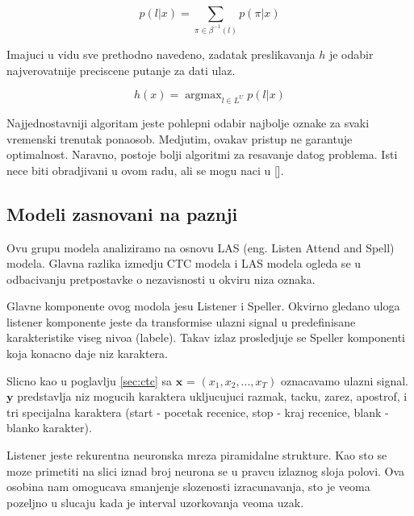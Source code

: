 \documentclass[a4paper]{article}
\DeclareMathOperator*{\argmax}{argmax}
\begin{document}
\begin{equation}
\label{eq:beta}
p(l | x) = \sum_{\pi \in \beta^{-1}(l)} p(\pi | x)
\end{equation}

Imajuci u vidu sve prethodno navedeno,  zadatak preslikavanja $h$ je odabir najverovatnije preciscene putanje za dati ulaz.

\begin{equation}
\label{eq:h_x}
h(x) = \argmax_{l \in L^U} p(l | x)
\end{equation}

Najjednostavniji algoritam jeste pohlepni odabir najbolje oznake za svaki vremenski trenutak ponaosob.  Medjutim, ovakav pristup ne garantuje optimalnost.  Naravno,  postoje bolji algoritmi za resavanje datog problema. Isti nece biti obradjivani u ovom radu, ali se mogu naci u [].

\subsection{Modeli zasnovani na paznji}

Ovu grupu modela analiziramo na osnovu LAS (eng.  Listen Attend and Spell) modela.  Glavna razlika izmedju CTC modela i LAS modela ogleda se u odbacivanju pretpostavke o nezavisnosti u okviru niza oznaka.  

\bigskip
Glavne komponente ovog modola jesu Listener i Speller.  Okvirno gledano uloga listener komponente jeste da transformise ulazni signal u predefinisane karakteristike viseg nivoa (labele).  Takav izlaz prosledjuje se Speller komponenti koja konacno daje niz karaktera. 

\bigskip

Slicno kao u poglavlju \ref{sec:ctc} sa $\textbf{x}$ = $(x_1,  x_2,  ...,  x_T)$ oznacavamo ulazni signal.  $\textbf{y}$ predstavlja niz mogucih karaktera ukljucujuci razmak,  tacku,  zarez,  apostrof,  i tri specijalna karaktera (start - pocetak recenice,  stop - kraj recenice,  blank - blanko karakter).

\bigskip

Listener jeste rekurentna neuronska mreza piramidalne strukture.  Kao sto se moze primetiti na slici iznad broj neurona se u pravcu izlaznog sloja polovi.  Ova osobina nam omogucava smanjenje slozenosti izracunavanja,  sto je veoma pozeljno u slucaju kada je interval uzorkovanja veoma uzak.
\end{document}
